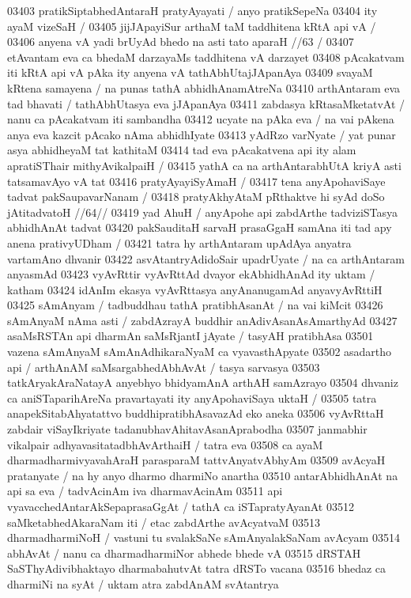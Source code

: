 03403 pratikSiptabhedAntaraH pratyAyayati / anyo pratikSepeNa
03404 ity ayaM vizeSaH /  
03405 jijJApayiSur arthaM taM taddhitena kRtA api vA /  
03406 anyena vA yadi brUyAd bhedo na asti tato aparaH //63 /  
03407 etAvantam eva ca bhedaM darzayaMs taddhitena vA darzayet 
03408 pAcakatvam iti kRtA api vA pAka ity anyena vA tathAbhUtajJApanAya
03409 svayaM kRtena samayena / na punas tathA abhidhAnamAtreNa 
03410 arthAntaram eva tad bhavati / tathAbhUtasya eva jJApanAya  
03411 zabdasya kRtasaMketatvAt / nanu ca pAcakatvam iti sambandha
03412 ucyate na pAka eva / na vai pAkena anya eva kazcit pAcako nAma abhidhIyate
03413 yAdRzo varNyate / yat punar asya abhidheyaM tat kathitaM  
03414 tad eva pAcakatvena api ity alam apratiSThair mithyAvikalpaiH /  
03415 yathA ca na arthAntarabhUtA kriyA asti tatsamavAyo vA tat 
03416 pratyAyayiSyAmaH /
03417 	tena anyApohaviSaye tadvat pakSaupavarNanam /
03418 	pratyAkhyAtaM pRthaktve hi syAd doSo jAtitadvatoH //64//  
03419 yad AhuH / anyApohe api zabdArthe tadviziSTasya abhidhAnAt tadvat 
03420 pakSauditaH sarvaH prasaGgaH samAna iti tad apy anena  prativyUDham /  
03421 tatra hy arthAntaram upAdAya anyatra vartamAno dhvanir
03422 asvAtantryAdidoSair upadrUyate / na ca arthAntaram anyasmAd
03423 vyAvRttir vyAvRttAd dvayor ekAbhidhAnAd ity uktam / katham
03424 idAnIm ekasya vyAvRttasya anyAnanugamAd anyavyAvRttiH  
03425 sAmAnyam / tadbuddhau tathA pratibhAsanAt / na vai kiMcit  
03426 sAmAnyaM nAma asti / zabdAzrayA buddhir anAdivAsanAsAmarthyAd
03427 asaMsRSTAn api dharmAn saMsRjantI jAyate / tasyAH pratibhAsa 
03501 vazena sAmAnyaM sAmAnAdhikaraNyaM ca vyavasthApyate  
03502 asadartho api / arthAnAM saMsargabhedAbhAvAt / tasya sarvasya  
03503 tatkAryakAraNatayA anyebhyo bhidyamAnA arthAH samAzrayo  
03504 dhvaniz ca aniSTaparihAreNa pravartayati ity anyApohaviSaya uktaH /
03505 tatra anapekSitabAhyatattvo buddhipratibhAsavazAd eko aneka 
03506 vyAvRttaH zabdair viSayIkriyate tadanubhavAhitavAsanAprabodha  
03507 janmabhir vikalpair adhyavasitatadbhAvArthaiH / tatra eva
03508 ca ayaM dharmadharmivyavahAraH parasparaM tattvAnyatvAbhyAm
03509 avAcyaH pratanyate / na hy anyo dharmo dharmiNo anartha  
03510 antarAbhidhAnAt na api sa eva / tadvAcinAm iva dharmavAcinAm 
03511 api vyavacchedAntarAkSepaprasaGgAt / tathA ca iSTapratyAyanAt  
03512 saMketabhedAkaraNam iti / etac zabdArthe avAcyatvaM  
03513 dharmadharmiNoH / vastuni tu svalakSaNe sAmAnyalakSaNam avAcyam 
03514 abhAvAt / nanu ca dharmadharmiNor abhede bhede vA
03515 dRSTAH SaSThyAdivibhaktayo dharmabahutvAt tatra dRSTo vacana 
03516 bhedaz ca dharmiNi na syAt / uktam atra zabdAnAM svAtantrya 

